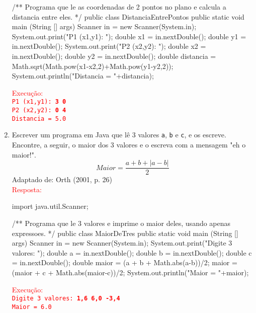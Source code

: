 \documentclass[onecolumn,a4paper,10pt]{report}
\newcommand{\+}{\, + \,}
\newcommand{\<}{\hspace*{-0.4cm}}
\begin{document}
\begin{enumerate}[1.]
\begin{javacode}
/**
   Programa que le as coordenadas de 2 pontos no plano e
   calcula a distancia entre eles.
*/
public class DistanciaEntrePontos {
    public static void main (String [] args) {
        Scanner in = new Scanner(System.in);
        System.out.print("P1 (x1,y1): ");
        double x1 = in.nextDouble();
        double y1 = in.nextDouble();
        System.out.print("P2 (x2,y2): ");
        double x2 = in.nextDouble();
        double y2 = in.nextDouble();
        double distancia = Math.sqrt(Math.pow(x1-x2,2)+Math.pow(y1-y2,2));
        System.out.println("Distancia = "+distancia);
    }
}
\end{javacode}
\textcolor{red}{Execução:\\
\texttt{P1 (x1,y1): \textbf{3 0}\\
P2 (x2,y2): \textbf{0 4}\\
Distancia = 5.0}
}

\item Escrever um programa em Java que lê 3 valores \texttt{a}, \texttt{b} e \texttt{c}, e os escreve. Encontre, a seguir, o maior dos 3 valores e o escreva com a mensagem "eh o maior!".
\[ Maior = \frac{a+b+|a-b|}{2} \]
{\tiny Adaptado de: Orth (2001, p. 26)}\\
\textcolor{red}{Resposta:}\\
\begin{javacode}
import java.util.Scanner;

/**
   Programa que le 3 valores e imprime o maior deles,
   usando apenas expressoes.
*/
public class MaiorDeTres {
    public static void main (String [] args) {
        Scanner in = new Scanner(System.in);
        System.out.print("Digite 3 valores: ");
        double a = in.nextDouble();
        double b = in.nextDouble();
        double c = in.nextDouble();
        double maior = (a + b + Math.abs(a-b))/2;
        maior = (maior + c + Math.abs(maior-c))/2;
        System.out.println("Maior = "+maior);
    }
}
\end{javacode}
\textcolor{red}{Execução:\\
\texttt{Digite 3 valores: \textbf{1,6 6,0  -3,4}\\
Maior = 6.0}
}


\end{enumerate}
\end{document}
